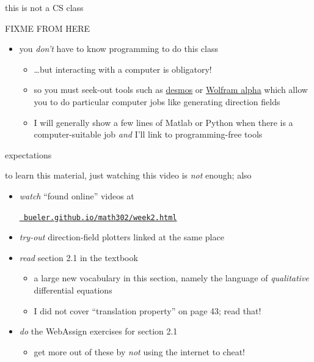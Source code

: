 \documentclass[colorlinks]{beamer}
\begin{document}
\begin{frame}{this is not a CS class}

FIXME FROM HERE

\begin{itemize}
\item you \emph{don't} have to know programming to do this class
    \begin{itemize}
    \item \dots \alert{but} interacting with a computer is obligatory!
    \item so you must seek-out tools such as \href{https://www.desmos.com/}{\color{cyan} desmos} or \href{https://www.wolframalpha.com/}{\color{cyan} Wolfram alpha} which allow you to do particular computer jobs like generating direction fields
    \item I will generally show a few lines of Matlab or Python when there is a computer-suitable job \emph{and} I'll link to programming-free tools
    \end{itemize}
\end{itemize}
\end{frame}


\begin{frame}{expectations}

to learn this material, just watching this video is \emph{not} enough; also
\begin{itemize}
\item \emph{watch} ``found online'' videos at

\centerline{\href{https://bueler.github.io/math302/week2.html}{\tt \color{cyan} bueler.github.io/math302/week2.html}}
\item \emph{try-out} direction-field plotters linked at the same place
\item \emph{read} section 2.1 in the textbook
    \begin{itemize}
    \item a large new vocabulary in this section, namely the language of \emph{qualitative} differential equations
    \item I did not cover ``translation property'' on page 43; read that!
    \end{itemize}
\item \emph{do} the WebAssign exercises for section 2.1
    \begin{itemize}
    \item get more out of these by \emph{not} using the internet to cheat!
    \end{itemize}
\end{itemize}
\end{frame}
\end{document}
